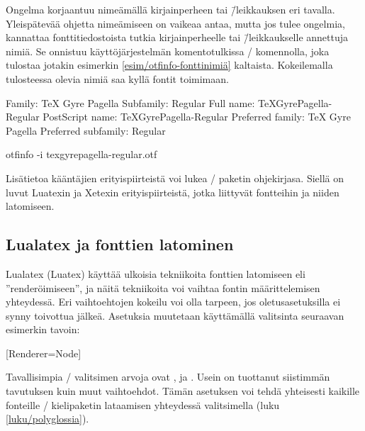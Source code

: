 Ongelma korjaantuu nimeämällä kirjainperheen tai \=/leikkauksen eri
tavalla. Yleispätevää ohjetta nimeämiseen on vaikeaa antaa, mutta jos
tulee ongelmia, kannattaa fonttitiedostoista tutkia kirjainperheelle tai
\=/leikkaukselle annettuja nimiä. Se onnistuu käyttöjärjestelmän
komentotulkissa \-/ komennolla, joka tulostaa jotakin
esimerkin \ref{esim/otfinfo-fonttinimiä} kaltaista. Kokeilemalla
tulosteessa olevia nimiä saa kyllä fontit toimimaan.

\begin{esimerkki*}
\begin{koodilohko}
Family:              TeX Gyre Pagella
Subfamily:           Regular
Full name:           TeXGyrePagella-Regular
PostScript name:     TeXGyrePagella-Regular
Preferred family:    TeX Gyre Pagella
Preferred subfamily: Regular
\end{koodilohko}
  \caption{\-/ komennon tuloste kertoo fontista muun
    muassa kirjainperheen ja \=/leikkauksen nimiä}
  \label{esim/otfinfo-fonttinimiä}
\end{esimerkki*}

\begin{koodilohkosis}
otfinfo -i texgyrepagella-regular.otf
\end{koodilohkosis}

\noindent
Lisätietoa kääntäjien erityispiirteistä voi lukea \-/
paketin ohjekirjasa. Siellä on luvut Luatexin ja Xetexin
erityispiirteistä, jotka liittyvät fontteihin ja niiden latomiseen.

\subsection{Lualatex ja fonttien latominen}
\label{luku/luatex-renderöinti}

Lualatex (Luatex) käyttää ulkoisia tekniikoita fonttien latomiseen eli
''renderöimiseen'', ja näitä tekniikoita voi vaihtaa fontin
määrittelemisen yhteydessä. Eri vaihtoehtojen kokeilu voi olla tarpeen,
jos oletusasetuksilla ei synny toivottua jälkeä. Asetuksia muutetaan
käyttämällä valitsinta  seuraavan esimerkin tavoin:

\begin{koodilohkosis}
\setmainfont{…}[Renderer=Node]
\end{koodilohkosis}

\noindent
Tavallisimpia \-/ valitsimen arvoja ovat
,  ja . Usein
 on tuottanut siistimmän tavutuksen kuin muut
vaihtoehdot. Tämän asetuksen voi tehdä yhteisesti kaikille fonteille
\-/ kielipaketin lataamisen yhteydessä valitsimella
 (luku \ref{luku/polyglossia}).

